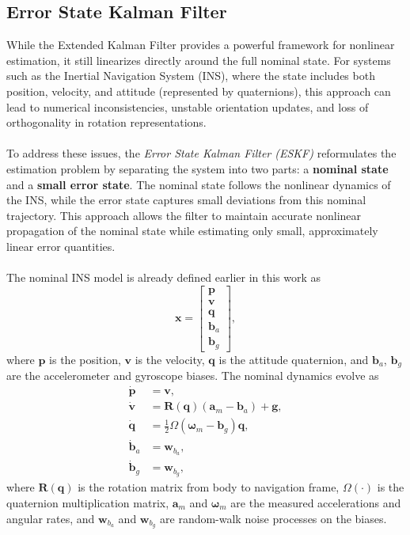 \subsection{Error State Kalman Filter}
While the Extended Kalman Filter provides a powerful framework for nonlinear estimation, it still linearizes directly around the full nominal state. For systems such as the Inertial Navigation System (INS), where the state includes both position, velocity, and attitude (represented by quaternions), this approach can lead to numerical inconsistencies, unstable orientation updates, and loss of orthogonality in rotation representations.  
\\ \\
To address these issues, the \textit{Error State Kalman Filter (ESKF)} reformulates the estimation problem by separating the system into two parts: a \textbf{nominal state} and a \textbf{small error state}. The nominal state follows the nonlinear dynamics of the INS, while the error state captures small deviations from this nominal trajectory. This approach allows the filter to maintain accurate nonlinear propagation of the nominal state while estimating only small, approximately linear error quantities.  
\\ \\
The nominal INS model is already defined earlier in this work as
$$
    \mathbf{x} =
    \begin{bmatrix}
        \mathbf{p} \\ \mathbf{v} \\ \mathbf{q} \\ \mathbf{b}_a \\ \mathbf{b}_g
    \end{bmatrix},
$$
where $\mathbf{p}$ is the position, $\mathbf{v}$ is the velocity, $\mathbf{q}$ is the attitude quaternion, and $\mathbf{b}_a$, $\mathbf{b}_g$ are the accelerometer and gyroscope biases. The nominal dynamics evolve as
$$
\begin{aligned}
    \dot{\mathbf{p}} &= \mathbf{v}, \\
    \dot{\mathbf{v}} &= \mathbf{R}(\mathbf{q})(\mathbf{a}_m - \mathbf{b}_a) + \mathbf{g}, \\
    \dot{\mathbf{q}} &= \tfrac{1}{2}\Omega(\boldsymbol{\omega}_m - \mathbf{b}_g)\mathbf{q}, \\
    \dot{\mathbf{b}}_a &= \mathbf{w}_{b_a}, \\
    \dot{\mathbf{b}}_g &= \mathbf{w}_{b_g},
\end{aligned}
$$
where $\mathbf{R}(\mathbf{q})$ is the rotation matrix from body to navigation frame, $\Omega(\cdot)$ is the quaternion multiplication matrix, $\mathbf{a}_m$ and $\boldsymbol{\omega}_m$ are the measured accelerations and angular rates, and $\mathbf{w}_{b_a}$ and $\mathbf{w}_{b_g}$ are random-walk noise processes on the biases.  
